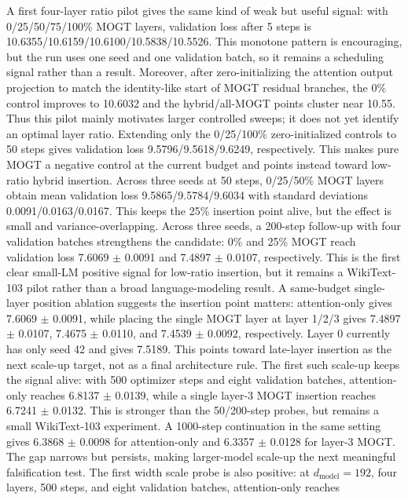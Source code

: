 \documentclass[10pt]{article}
\newcommand{\mogt}{MOGT}
\begin{document}
A first four-layer ratio pilot gives the same kind of weak but useful signal:
with 0/25/50/75/100\% \mogt{} layers, validation loss after 5 steps is
10.6355/10.6159/10.6100/10.5838/10.5526. This monotone pattern is encouraging,
but the run uses one seed and one validation batch, so it remains a scheduling
signal rather than a result. Moreover, after zero-initializing the attention
output projection to match the identity-like start of \mogt{} residual
branches, the 0\% control improves to 10.6032 and the hybrid/all-\mogt{} points
cluster near 10.55. Thus this pilot mainly motivates larger controlled sweeps;
it does not yet identify an optimal layer ratio.
Extending only the 0/25/100\% zero-initialized controls to 50 steps gives
validation loss 9.5796/9.5618/9.6249, respectively. This makes pure \mogt{} a
negative control at the current budget and points instead toward low-ratio
hybrid insertion.
Across three seeds at 50 steps, 0/25/50\% \mogt{} layers obtain mean validation
loss 9.5865/9.5784/9.6034 with standard deviations 0.0091/0.0163/0.0167. This
keeps the 25\% insertion point alive, but the effect is small and
variance-overlapping.
Across three seeds, a 200-step follow-up with four validation batches
strengthens the candidate: 0\% and 25\% \mogt{} reach validation loss
7.6069 $\pm$ 0.0091 and 7.4897 $\pm$ 0.0107, respectively. This is the first
clear small-LM positive signal for low-ratio insertion, but it remains a
WikiText-103 pilot rather than a broad language-modeling result.
A same-budget single-layer position ablation suggests the insertion point
matters: attention-only gives 7.6069 $\pm$ 0.0091, while placing the single
\mogt{} layer at layer 1/2/3 gives 7.4897 $\pm$ 0.0107,
7.4675 $\pm$ 0.0110, and 7.4539 $\pm$ 0.0092, respectively. Layer 0 currently
has only seed 42 and gives 7.5189. This points toward late-layer insertion as
the next scale-up target, not as a final architecture rule.
The first such scale-up keeps the signal alive: with 500 optimizer steps and
eight validation batches, attention-only reaches 6.8137 $\pm$ 0.0139, while a
single layer-3 \mogt{} insertion reaches 6.7241 $\pm$ 0.0132. This is stronger
than the 50/200-step probes, but remains a small WikiText-103 experiment.
A 1000-step continuation in the same setting gives 6.3868 $\pm$ 0.0098 for
attention-only and 6.3357 $\pm$ 0.0128 for layer-3 \mogt{}. The gap narrows but
persists, making larger-model scale-up the next meaningful falsification test.
The first width scale probe is also positive: at $d_{\mathrm{model}}=192$,
four layers, 500 steps, and eight validation batches, attention-only reaches
\end{document}
